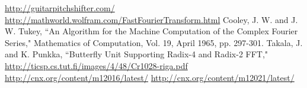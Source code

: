 \documentclass[12pt, letterpaper]{article}
\begin{document}

\begin{thebibliography}{10}
 \url{http://guitarpitchshifter.com/}
 \url{http://mathworld.wolfram.com/FastFourierTransform.html}
 	Cooley, J. W. and J. W. Tukey, ``An Algorithm for the Machine Computation of the Complex Fourier Series," Mathematics of Computation, Vol. 19, April 1965, pp. 297-301.
 Takala, J. and K. Punkka, ``Butterfly Unit Supporting Radix-4 and Radix-2 FFT," \url{http://ticsp.cs.tut.fi/images/4/48/Cr1028-riga.pdf}
 \url{http://cnx.org/content/m12016/latest/}
 \url{http://cnx.org/content/m12021/latest/}
\end{thebibliography}
\end{document}
